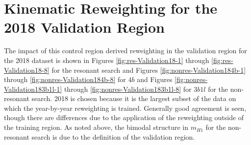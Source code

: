 \chapter{Kinematic Reweighting for the 2018 Validation Region}
\label{app:reweight-plots}

The impact of this control region derived reweighting in the validation region for the 2018 dataset 
is shown in Figures \ref{fig:res-Validation18-1} 
through \ref{fig:res-Validation18-8} for the resonant search and Figures \ref{fig:nonres-Validation184b-1} 
through \ref{fig:nonres-Validation184b-8} for $4b$ and Figures \ref{fig:nonres-Validation183b1l-1} 
through \ref{fig:nonres-Validation183b1l-8} for $3b1l$ for the non-resonant 
search. 2018 is chosen because it is the largest subset of the data on which the year-by-year reweighting 
is trained. Generally good agreement is seen, though there are differences due to the application of 
the reweighting outside of the training region. As noted above, the bimodal structure in $m_{H1}$ for the 
non-resonant search is due to the definition of the validation region.


